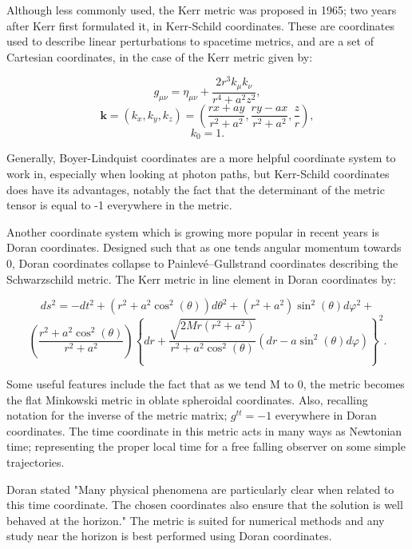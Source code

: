 \documentclass[oneside,openright,frontopenright, singlespacing]{dmathesis}
\begin{document}
\vspace{1em}
	Although less commonly used, the Kerr metric was proposed in 1965; two years after Kerr first formulated it, in Kerr-Schild coordinates. These are coordinates used to describe linear perturbations to spacetime metrics, and are a set of Cartesian coordinates, in the case of the Kerr metric given by:

	\[g_{\mu\nu} = \eta_{\mu\nu} + \frac{2r^{3}k_{\mu}k_{\nu}}{r^{4}+a^{2}z^{2}},\]
	\[\textbf{k} = (k_x,k_y,k_z) = \left(\frac{rx+ay}{r^2+a^2},\frac{ry-ax}{r^2+a^2},\frac{z}{r}\right),\]
	\[k_0 = 1.\]

\vspace{1em}
	Generally, Boyer-Lindquist coordinates are a more helpful coordinate system to work in, especially when looking at photon paths, but Kerr-Schild coordinates does have its advantages, notably the fact that the determinant of the metric tensor is equal to -1 everywhere in the metric.

\vspace{1em}
	Another coordinate system which is growing more popular in recent years is Doran coordinates\cite{doran2000new}. Designed such that as one tends angular momentum towards 0, Doran coordinates collapse to Painlev\'e–Gullstrand coordinates\cite{painleve1921mecanique} describing the Schwarzschild metric. The Kerr metric in line element in Doran coordinates by:

	\[ds^2=-dt^2+(r^2+a^2\cos^2(\theta))d\theta^2+(r^2+a^2)\sin^2(\theta)d\varphi^2+\]
	\[\left(\frac{r^2+a^2\cos^2(\theta)}{r^2+a^2}\right)\left\{dr+\frac{\sqrt{2Mr(r^2+a^2)}}{r^2+a^2\cos^2(\theta)}(dr-a\sin^2(\theta)d\varphi)\right\}^2.\]

\vspace{1em}
	Some useful features include the fact that as we tend M to 0, the metric becomes the flat Minkowski metric in oblate spheroidal coordinates. Also, recalling notation for the inverse of the metric matrix; $g^{tt}=-1$ everywhere in Doran coordinates. The time coordinate in this metric acts in many ways as Newtonian time; representing the proper local time for a free falling observer on some simple trajectories. 

\vspace{1em}
	Doran stated "Many physical phenomena are particularly clear when related to this time coordinate. The chosen coordinates also ensure that the solution is well behaved at the horizon."\cite{doran2000new} The metric is suited for numerical methods and any study near the horizon is best performed using Doran coordinates.
\end{document}
